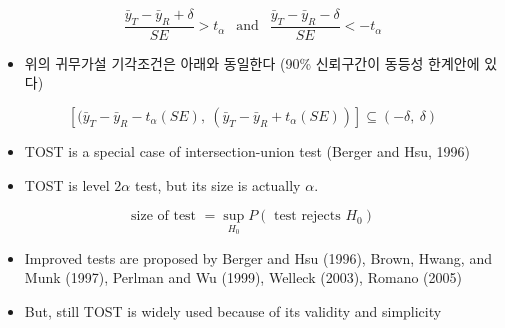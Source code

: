 \documentclass[
]{book}
\providecommand{\tightlist}{%
  \setlength{\itemsep}{0pt}\setlength{\parskip}{0pt}}
\begin{document}
\[
\frac{ \bar {y}_T-  \bar {y}_R +\delta}{SE} > t_\alpha ~~\text{ and }~~
\frac{ \bar {y}_T-  \bar {y}_R -\delta}{SE} <- t_\alpha 
\]

\begin{itemize}
\tightlist
\item
  위의 귀무가설 기각조건은 아래와 동일한다 (90\% 신뢰구간이 동등성 한계안에 있다)
\end{itemize}

\[ 
[(\bar {y}_T-  \bar {y}_R - t_\alpha (SE),~ (\bar {y}_T-  \bar {y}_R + t_\alpha(SE) )] \subseteq
(-\delta,~\delta) 
\]

\begin{itemize}
\item
  TOST is a special case of intersection-union test (Berger and Hsu, 1996)
\item
  TOST is level \(2\alpha\) test, but its size is actually \(\alpha\).
\end{itemize}

\[ \text{size of test } = \sup_{H_0} P( \text{ test rejects } H_0 ) \]

\begin{itemize}
\item
  Improved tests are proposed by Berger and Hsu (1996), Brown, Hwang, and Munk (1997), Perlman and Wu (1999), Welleck (2003), Romano (2005)
\item
  But, still TOST is widely used because of its validity and simplicity
\end{itemize}

\backmatter

  
\end{document}
